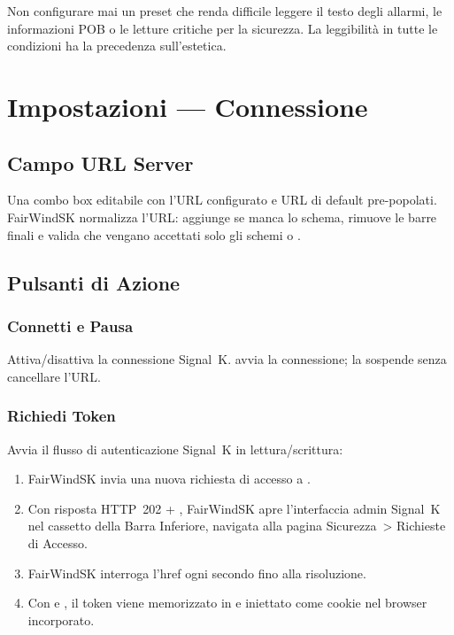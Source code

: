 \begin{warningbox}
Non configurare mai un preset che renda difficile leggere il testo degli allarmi,
le informazioni POB o le letture critiche per la sicurezza.
La leggibilità in tutte le condizioni ha la precedenza sull'estetica.
\end{warningbox}

\chapter{Impostazioni --- Connessione}
\label{ch:impostazioni-connessione}


\section{Campo URL Server}

Una combo box editabile con l'URL configurato e URL di default pre-popolati.
FairWindSK normalizza l'URL: aggiunge  se manca lo schema,
rimuove le barre finali e valida che vengano accettati solo gli schemi
 o .

\section{Pulsanti di Azione}

\subsection{Connetti e Pausa}

Attiva/disattiva la connessione Signal~K.
 avvia la connessione;  la sospende senza cancellare l'URL.

\subsection{Richiedi Token}

Avvia il flusso di autenticazione Signal~K in lettura/scrittura:

\begin{enumerate}
  \item FairWindSK invia una nuova richiesta di accesso a .
  \item Con risposta HTTP~202 + , FairWindSK apre l'interfaccia admin Signal~K
        nel cassetto della Barra Inferiore, navigata alla pagina Sicurezza~> Richieste di Accesso.
  \item FairWindSK interroga l'href ogni secondo fino alla risoluzione.
  \item Con  e , il token viene memorizzato in
         e iniettato come cookie  nel browser incorporato.
\end{enumerate}

